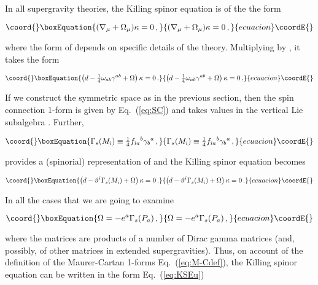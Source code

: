 \documentclass[12pt,a4paper]{article}
\begin{document}
In all supergravity theories, the Killing spinor equation is of the
the form

\begin{equation}\coord{}\boxEquation{
(\nabla_{\mu} + \Omega_{\mu})\kappa=0\, , 
}{
(\nabla_{\mu} + \Omega_{\mu})\kappa=0\, , 
}{ecuacion}\coordE{}\end{equation}

\noindent
where the form of \myHighlight{$\Omega$}\coordHE{} depends on specific details of the theory.
Multiplying by \coordHE{}, it takes the form

\begin{equation}\coord{}\boxEquation{
\left(d -{\textstyle\frac{1}{4}}\omega_{ab}\gamma^{ab} 
+\Omega \right)\kappa=0\, .
}{
\left(d -{\textstyle\frac{1}{4}}\omega_{ab}\gamma^{ab} 
+\Omega \right)\kappa=0\, .
}{ecuacion}\coordE{}\end{equation}

If we construct the symmetric space as in the previous section, then
the spin connection 1-form \coordHE{} is given by Eq.~(\ref{eq:SC})
and takes values in the vertical Lie subalgebra \coordHE{}.
Further, 

\begin{equation}\coord{}\boxEquation{
\Gamma_{s}(M_{i})\equiv 
{\textstyle\frac{1}{4}}f_{ia}{}^{b}\gamma_{b}{}^{a}\, ,  
}{
\Gamma_{s}(M_{i})\equiv 
{\textstyle\frac{1}{4}}f_{ia}{}^{b}\gamma_{b}{}^{a}\, ,  
}{ecuacion}\coordE{}\end{equation}

\noindent
provides a (spinorial) representation of \coordHE{} and the
Killing spinor equation becomes

\begin{equation}\coord{}\boxEquation{
\left(d -\vartheta^{i}\Gamma_{s}(M_{i})
+\Omega \right)\kappa=0\, .
}{
\left(d -\vartheta^{i}\Gamma_{s}(M_{i})
+\Omega \right)\kappa=0\, .
}{ecuacion}\coordE{}\end{equation}

In all the cases that we are going to examine 

\begin{equation}\coord{}\boxEquation{
\Omega = -e^{a}\Gamma_{s}(P_{a})\, ,  
}{
\Omega = -e^{a}\Gamma_{s}(P_{a})\, ,  
}{ecuacion}\coordE{}\end{equation}

\noindent
where the matrices \coordHE{} are products of a number of
Dirac gamma matrices (and, possibly, of other matrices in extended
supergravities). Thus, on account of the definition of the
Maurer-Cartan 1-forms Eq.~(\ref{eq:M-Cdef}), the Killing spinor equation
can be written in the form Eq.~(\ref{eq:KSEu})
\end{document}
